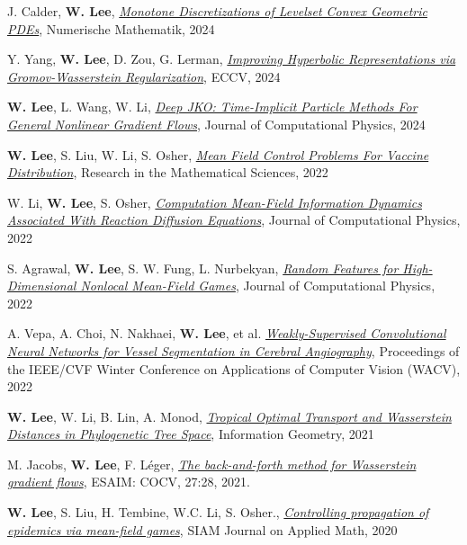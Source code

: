 \begin{cvparagraph}
\begin{cvitems}
  \item J. Calder, \textbf{W. Lee}, \href{https://rdcu.be/dZfbw}{\textit{Monotone Discretizations of Levelset Convex Geometric PDEs}}, Numerische Mathematik, 2024
  \item Y. Yang, \textbf{W. Lee}, D. Zou, G. Lerman, \href{http://arxiv.org/abs/2407.10495}{\textit{Improving Hyperbolic Representations via Gromov-Wasserstein Regularization}}, ECCV, 2024
  \item \textbf{W. Lee}, L. Wang, W. Li, \href{https://arxiv.org/abs/2311.06700}{\textit{Deep JKO: Time-Implicit Particle Methods For General Nonlinear Gradient Flows}}, Journal of Computational Physics, 2024
  \item \textbf{W. Lee}, S. Liu, W. Li, S. Osher, \href{https://arxiv.org/pdf/2104.11887.pdf}{\textit{Mean Field Control Problems For Vaccine Distribution}}, Research in the Mathematical Sciences, 2022
    \item W. Li, \textbf{W. Lee}, S. Osher, \href{https://arxiv.org/pdf/2107.11501.pdf}{\textit{Computation Mean-Field Information Dynamics Associated With Reaction Diffusion Equations}}, Journal of Computational Physics, 2022
    \item S. Agrawal, \textbf{W. Lee}, S. W. Fung, L. Nurbekyan, \href{https://arxiv.org/abs/2202.12529}{\textit{Random Features for High-Dimensional Nonlocal Mean-Field Games}}, Journal of Computational Physics, 2022
    \item A. Vepa, A. Choi, N. Nakhaei, \textbf{W. Lee}, et al. \href{https://openaccess.thecvf.com/content/WACV2022/html/Vepa_Weakly-Supervised_Convolutional_Neural_Networks_for_Vessel_Segmentation_in_Cerebral_Angiography_WACV_2022_paper.html}{\textit{Weakly-Supervised Convolutional Neural Networks for Vessel Segmentation in Cerebral Angiography}}, Proceedings of the IEEE/CVF Winter Conference on Applications of Computer Vision (WACV), 2022
    \item \textbf{W. Lee}, W. Li, B. Lin, A. Monod, \href{https://arxiv.org/pdf/1911.05401v1.pdf}{\textit{Tropical Optimal Transport and Wasserstein Distances in Phylogenetic Tree Space}}, {Information Geometry}, 2021
    \item M. Jacobs, \textbf{W. Lee}, F. Léger, \href{https://arxiv.org/pdf/2011.08151}{\textit{The back-and-forth method for Wasserstein gradient flows}}, {ESAIM: COCV}, 27:28, 2021.
    \item \textbf{W. Lee}, S. Liu, H. Tembine, W.C. Li, S. Osher., \href{https://www.researchgate.net/publication/341804278_Controlling_Propagation_of_epidemics_via_mean-field_games}{\textit{Controlling propagation of epidemics via mean-field games}}, {SIAM Journal on Applied Math}, 2020

\end{cvitems}
\end{cvparagraph}
